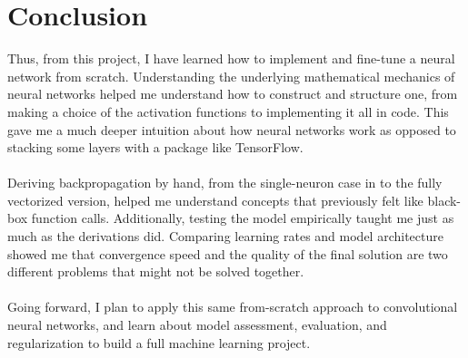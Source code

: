 \documentclass{article}
\begin{document}
\section{Conclusion}

Thus, from this project, I have learned how to implement and fine-tune a neural network from scratch. Understanding the underlying mathematical mechanics of neural networks helped me understand how to construct and structure one, from making a choice of the activation functions to implementing it all in code. This gave me a much deeper intuition about how neural networks work as opposed to stacking some layers with a package like TensorFlow.
\\\\
Deriving backpropagation by hand, from the single-neuron case in to the fully vectorized version, helped me understand concepts that previously felt like black-box function calls. Additionally, testing the model empirically taught me just as much as the derivations did. Comparing learning rates and model architecture showed me that convergence speed and the quality of the final solution are two different problems that might not be solved together. 
\\\\
Going forward, I plan to apply this same from-scratch approach to convolutional neural networks, and learn about model assessment, evaluation, and regularization to build a full machine learning project.

\clearpage
\end{document}
